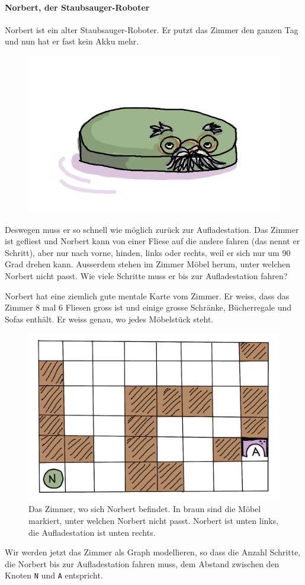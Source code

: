\paragraph{Norbert, der Staubsauger-Roboter}
Norbert ist ein alter Staubsauger-Roboter. Er putzt das Zimmer den ganzen Tag und nun hat er fast kein Akku mehr.
\begin{figure}
\includegraphics[width=0.9\linewidth]{Pictures/SP/norbert.png} 
\label{fig:norbert}
\end{figure}
Deswegen muss er so schnell wie möglich zurück zur Aufladestation.
Das Zimmer ist gefliest und Norbert kann von einer Fliese auf die andere fahren (das nennt er Schritt), aber nur nach vorne, hinden, links oder rechts, weil er sich nur um 90 Grad drehen kann. Ausserdem stehen im Zimmer Möbel herum, unter welchen Norbert nicht passt. Wie viele Schritte muss er bis zur Aufladestation fahren?

Norbert hat eine ziemlich gute mentale Karte vom Zimmer. Er weiss, dass das Zimmer 8 mal 6 Fliesen gross ist und einige grosse Schränke, Bücherregale und Sofas enthält. Er weiss genau, wo jedes Möbelstück steht.
\begin{figure}[H]
    \centering
    \includegraphics[width=\textwidth]{Pictures/SP/norbert_zimmer.png}
    \caption{Das Zimmer, wo sich Norbert befindet. In braun sind die Möbel markiert, unter welchen Norbert nicht passt. Norbert ist unten links, die Aufladestation ist unten rechts.}
    \label{fig:norbert_zimmer}
\end{figure}
Wir werden jetzt das Zimmer als Graph modellieren, so dass die Anzahl Schritte, die Norbert bis zur Aufladestation fahren muss, dem Abstand zwischen den Knoten \texttt{N} und \texttt{A} entspricht.

